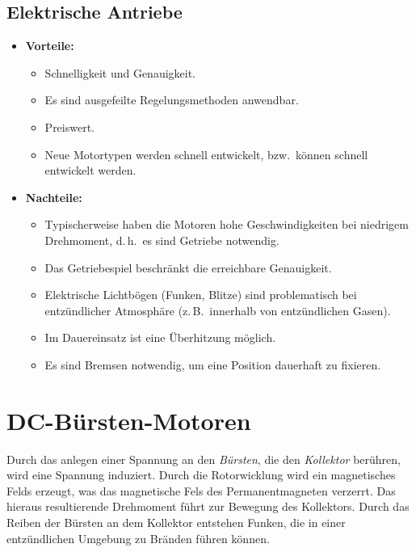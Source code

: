\documentclass[a4paper, 11pt, accentcolor = tud3b]{tudreport}
\renewcommand{\dh}{d.\,h.~}
\newcommand{\bzw}{bzw.~}
\newcommand{\zB}{z.\,B.~}
\begin{document}
			\subsection{Elektrische Antriebe}
				\begin{itemize}
					\item \textbf{Vorteile:}
						\begin{itemize}
							\item Schnelligkeit und Genauigkeit.
							\item Es sind ausgefeilte Regelungsmethoden anwendbar.
							\item Preiswert.
							\item Neue Motortypen werden schnell entwickelt, \bzw können schnell entwickelt werden.
						\end{itemize}
					\item \textbf{Nachteile:}
						\begin{itemize}
							\item Typischerweise haben die Motoren hohe Geschwindigkeiten bei niedrigem Drehmoment, \dh es sind Getriebe notwendig.
							\item Das Getriebespiel beschränkt die erreichbare Genauigkeit.
							\item Elektrische Lichtbögen (Funken, Blitze) sind problematisch bei entzündlicher Atmosphäre (\zB innerhalb von entzündlichen Gasen).
							\item Im Dauereinsatz ist eine Überhitzung möglich.
							\item Es sind Bremsen notwendig, um eine Position dauerhaft zu fixieren.
						\end{itemize}
				\end{itemize}

		\section{DC-Bürsten-Motoren}
			Durch das anlegen einer Spannung an den \emph{Bürsten}, die den \emph{Kollektor} berühren, wird eine Spannung induziert. Durch die Rotorwicklung wird ein magnetisches Felds erzeugt, was das magnetische Fels des Permanentmagneten verzerrt. Das hieraus resultierende Drehmoment führt zur Bewegung des Kollektors. Durch das Reiben der Bürsten an dem Kollektor entstehen Funken, die in einer entzündlichen Umgebung zu Bränden führen können.
			
\end{document}
